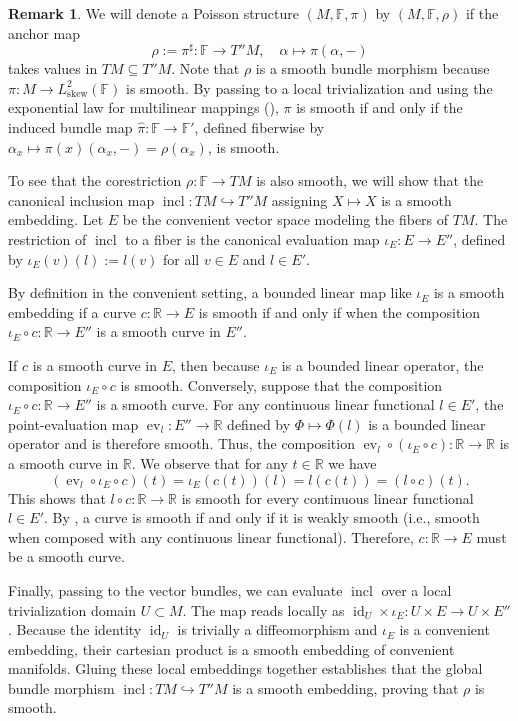 \documentclass[11pt,reqno]{amsart}
\theoremstyle{definition}
\newtheorem{remark}[theorem]{Remark}
\numberwithin{equation}{section}
\begin{document}
\begin{remark}\label{smoooth anchor}
We will denote a Poisson structure $(M, \mathbb{F}, \pi)$ by $(M, \mathbb{F}, \rho)$ if the anchor map 
\[
\rho := \pi^\sharp: \mathbb{F} \to T''M, \quad \alpha \mapsto \pi(\alpha, -) 
\] 
takes values in $TM \subseteq T''M$. Note that $\rho$ is a smooth bundle morphism because $\pi: M \to L^2_{\text{skew}}(\mathbb{F})$ is smooth. By passing to a local trivialization and using the exponential law for multilinear mappings (\cite[Proposition 5.2]{20}), $\pi$ is smooth if and only if the induced bundle map $\widehat{\pi}: \mathbb{F} \to \mathbb{F}'$, defined fiberwise by $\alpha_x \mapsto \pi(x)(\alpha_x, -) = \rho(\alpha_x)$, is smooth. 

To see that the corestriction $\rho: \mathbb{F} \to TM$ is also smooth, we will show that the canonical inclusion map $\operatorname{incl}: TM \hookrightarrow T''M$ assigning $X \mapsto X$ is a smooth embedding. Let $E$ be the convenient vector space modeling the fibers of $TM$. The restriction of $\operatorname{incl}$ to a fiber is the canonical evaluation map $\iota_E: E \rightarrow E''$, defined by $\iota_E(v)(l) := l(v)$ for all $v \in E$ and $l \in E'$.

By definition in the convenient setting, a bounded linear map like $\iota_E$ is a smooth embedding if a curve $c: \mathbb{R} \rightarrow E$ is smooth if and only if when the composition $\iota_E \circ c: \mathbb{R} \rightarrow E''$ is a smooth curve in $E''$. 

If $c$ is a smooth curve in $E$, then because $\iota_E$ is a bounded linear operator, the composition $\iota_E \circ c$ is smooth. Conversely, suppose that the composition $\iota_E \circ c: \mathbb{R} \rightarrow E''$ is a smooth curve. For any continuous linear functional $l \in E'$, the point-evaluation map $\operatorname{ev}_l: E'' \rightarrow \mathbb{R}$ defined by $\Phi \mapsto \Phi(l)$ is a bounded linear operator and is therefore smooth. Thus, the composition $\operatorname{ev}_l \circ (\iota_E \circ c): \mathbb{R} \rightarrow \mathbb{R}$ is a smooth curve in $\mathbb{R}$. We observe that for any $t \in \mathbb{R}$ we have
\[ 
(\operatorname{ev}_l \circ \iota_E \circ c)(t) = \iota_E(c(t))(l) = l(c(t)) = (l \circ c)(t).
\]
This shows that $l \circ c: \mathbb{R} \rightarrow \mathbb{R}$ is smooth for every continuous linear functional $l \in E'$. By \cite[Corollary 2.3]{20}, a curve is smooth if and only if it is weakly smooth (i.e., smooth when composed with any continuous linear functional). Therefore, $c: \mathbb{R} \rightarrow E$ must be a smooth curve.

 Finally, passing to the vector bundles, we can evaluate $\operatorname{incl}$ over a local trivialization domain $U \subset M$. The map reads locally as $\operatorname{id}_U \times \iota_E: U \times E \rightarrow U \times E''$. Because the identity $\operatorname{id}_U$ is trivially a diffeomorphism and $\iota_E$ is a convenient embedding, their cartesian product is a smooth embedding of convenient manifolds. Gluing these local embeddings together establishes that the global bundle morphism $\operatorname{incl}: TM \hookrightarrow T''M$ is a smooth embedding, proving that $\rho$ is smooth.
\end{remark}
\end{document}
